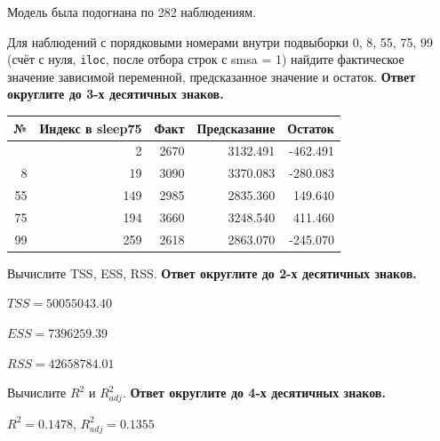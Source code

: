 \documentclass[
  russian,
]{article}
\newcounter{none} %
\begin{document}
Модель была подогнана по 282 наблюдениям.

Для наблюдений с порядковыми номерами внутри подвыборки 0, 8, 55, 75, 99
(счёт с нуля, \texttt{iloc}, после отбора строк с smsa = 1) найдите
фактическое значение зависимой переменной, предсказанное значение и
остаток. \textbf{Ответ округлите до 3-х десятичных знаков.}

{\def\LTcaptype{none} %
\begin{longtable}[]{@{}rrrrr@{}}
\toprule\noalign{}
№ & Индекс в sleep75 & Факт & Предсказание & Остаток \\
\midrule\noalign{}
\endhead
\bottomrule\noalign{}
\endlastfoot
0 & 2 & 2670 & 3132.491 & -462.491 \\
8 & 19 & 3090 & 3370.083 & -280.083 \\
55 & 149 & 2985 & 2835.360 & 149.640 \\
75 & 194 & 3660 & 3248.540 & 411.460 \\
99 & 259 & 2618 & 2863.070 & -245.070 \\
\end{longtable}
}

Вычислите TSS, ESS, RSS. \textbf{Ответ округлите до 2-х десятичных
знаков.}

\begin{tcolorbox}[enhanced jigsaw, arc=.35mm, bottomrule=.15mm, bottomtitle=1mm, breakable, colback=white, colbacktitle=quarto-callout-note-color!10!white, colframe=quarto-callout-note-color-frame, coltitle=black, left=2mm, leftrule=.75mm, opacityback=0, opacitybacktitle=0.6, rightrule=.15mm, title=\textcolor{quarto-callout-note-color}{\faInfo}\hspace{0.5em}{Суммы квадратов}, titlerule=0mm, toprule=.15mm, toptitle=1mm]

\(TSS = 50055043.40\)

\(ESS = 7396259.39\)

\(RSS = 42658784.01\)

\end{tcolorbox}

Вычислите \(R^2\) и \(R^2_{adj}\). \textbf{Ответ округлите до 4-х
десятичных знаков.}

\begin{tcolorbox}[enhanced jigsaw, arc=.35mm, bottomrule=.15mm, bottomtitle=1mm, breakable, colback=white, colbacktitle=quarto-callout-note-color!10!white, colframe=quarto-callout-note-color-frame, coltitle=black, left=2mm, leftrule=.75mm, opacityback=0, opacitybacktitle=0.6, rightrule=.15mm, title=\textcolor{quarto-callout-note-color}{\faInfo}\hspace{0.5em}{Коэффициент детерминации}, titlerule=0mm, toprule=.15mm, toptitle=1mm]

\(R^2 = 0.1478\), \(R^2_{adj} = 0.1355\)

\end{tcolorbox}
\end{document}
